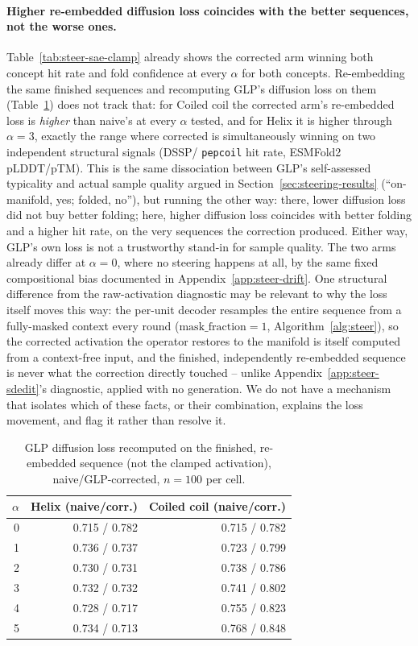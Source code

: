 \documentclass{article}
\begin{document}
\paragraph{Higher re-embedded diffusion loss coincides with the better sequences, not the worse
ones.} Table~\ref{tab:steer-sae-clamp} already shows the corrected arm winning both concept hit
rate and fold confidence at every $\alpha$ for both concepts. Re-embedding the same finished
sequences and recomputing GLP's diffusion loss on them (Table~\ref{tab:steer-sae-clamp-dloss})
does not track that: for Coiled coil the corrected arm's re-embedded loss is \emph{higher} than
naive's at every $\alpha$ tested, and for Helix it is higher through $\alpha{=}3$, exactly the
range where corrected is simultaneously winning on two independent structural signals (DSSP/
\texttt{pepcoil} hit rate, ESMFold2 pLDDT/pTM). This is the same dissociation between GLP's
self-assessed typicality and actual sample quality argued in
Section~\ref{sec:steering-results} (``on-manifold, yes; folded, no''), but running the other
way: there, lower diffusion loss did not buy better folding; here, higher diffusion loss
coincides with better folding and a higher hit rate, on the very sequences the correction
produced. Either way, GLP's own loss is not a trustworthy stand-in for sample quality. The two
arms already differ at $\alpha{=}0$, where no steering happens at all, by the same fixed
compositional bias documented in Appendix~\ref{app:steer-drift}. One structural difference from
the raw-activation diagnostic may be relevant to why the loss itself moves this way: the
per-unit decoder resamples the entire sequence from a fully-masked context every round
($\mathrm{mask\_fraction}{=}1$, Algorithm~\ref{alg:steer}), so the corrected activation the
operator restores to the manifold is itself computed from a context-free input, and the
finished, independently re-embedded sequence is never what the correction directly touched --
unlike Appendix~\ref{app:steer-sdedit}'s diagnostic, applied with no generation. We do not have
a mechanism that isolates which of these facts, or their combination, explains the loss
movement, and flag it rather than resolve it.

\begin{table}[htbp]
\centering
\caption{GLP diffusion loss recomputed on the finished, re-embedded sequence (not the clamped
activation), naive/GLP-corrected, $n{=}100$ per cell.}
\label{tab:steer-sae-clamp-dloss}
\begin{tabular}{rrr}
\toprule
$\alpha$ & Helix (naive/corr.) & Coiled coil (naive/corr.) \\
\midrule
0 & 0.715 / 0.782 & 0.715 / 0.782 \\
1 & 0.736 / 0.737 & 0.723 / 0.799 \\
2 & 0.730 / 0.731 & 0.738 / 0.786 \\
3 & 0.732 / 0.732 & 0.741 / 0.802 \\
4 & 0.728 / 0.717 & 0.755 / 0.823 \\
5 & 0.734 / 0.713 & 0.768 / 0.848 \\
\bottomrule
\end{tabular}
\end{table}
\end{document}
